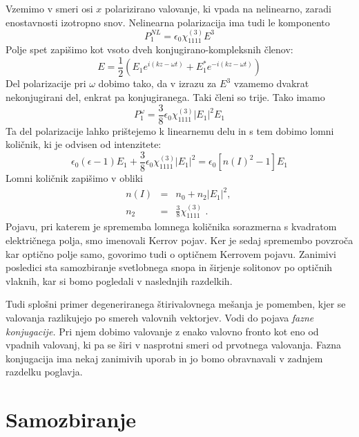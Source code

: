 \documentclass[11pt,fleqn]{book} %
\begin{document}
Vzemimo v smeri osi $x$ polarizirano valovanje, ki vpada na nelinearno,
zaradi enostavnosti izotropno snov. Nelinearna polarizacija ima tudi
le komponento 
\begin{equation}
P_{1}^{NL}=\epsilon_{0}\chi_{1111}^{(3)}E^{3}\label{8.70}
\end{equation}
 Polje spet zapišimo kot vsoto dveh konjugirano-kompleksnih členov:
\begin{equation}
E=\frac{1}{2}(E_{1}e^{i(kz-\omega t)}+E_{1}^{*}e^{-i(kz-\omega t)})\label{8.71}
\end{equation}
 Del polarizacije pri $\omega$ dobimo tako, da v izrazu za $E^{3}$
vzamemo dvakrat nekonjugirani del, enkrat pa konjugiranega. Taki členi
so trije. Tako imamo 
\begin{equation}
P_{1}^{\omega}=\frac{3}{8}\epsilon_{0}\chi_{1111}^{\left(3\right)}|E_{1}|^{2}E_{1}\label{8.72}
\end{equation}
 Ta del polarizacije lahko prištejemo k linearnemu delu in s tem dobimo
lomni količnik, ki je odvisen od intenzitete: 
\begin{equation}
\epsilon_{0}(\epsilon-1)E_{1}+\frac{3}{8}\epsilon_{0}\chi_{1111}^{\left(3\right)}|E_{1}|^{2}=\epsilon_{0}[n(I)^{2}-1]E_{1}\label{8.73}
\end{equation}
 Lomni količnik zapišimo v obliki 
\begin{eqnarray}
n(I) & = & n_{0}+n_{2}|E_{1}|^{2}\text{, }\\
n_{2} & = & \frac{3}{8}\chi_{1111}^{\left(3\right)}\text{ .}\label{8.74}
\end{eqnarray}
 Pojavu, pri katerem je sprememba lomnega količnika sorazmerna s kvadratom
električnega polja, smo imenovali Kerrov pojav. Ker je sedaj spremembo
povzroča kar optično polje samo, govorimo tudi o optičnem Kerrovem
pojavu. Zanimivi posledici sta samozbiranje svetlobnega snopa in širjenje
solitonov po optičnih vlaknih, kar si bomo pogledali v naslednjih
razdelkih.

Tudi splošni primer degeneriranega štirivalovnega mešanja je pomemben,
kjer se valovanja razlikujejo po smereh valovnih vektorjev. Vodi do
pojava \textit{fazne konjugacije. }Pri njem dobimo valovanje z enako
valovno fronto kot eno od vpadnih valovanj, ki pa se širi v nasprotni
smeri od prvotnega valovanja. Fazna konjugacija ima nekaj zanimivih
uporab in jo bomo obravnavali v zadnjem razdelku poglavja.


\section{Samozbiranje}
\end{document}
